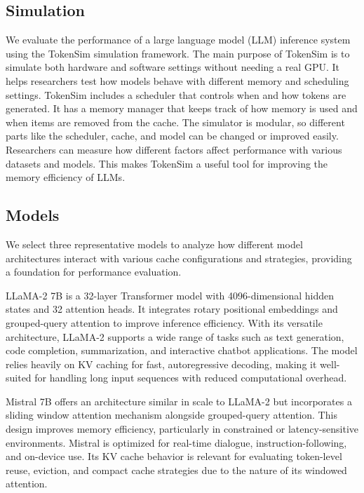 \documentclass[sigconf,nonacm]{acmart}
\begin{document}
\vspace{-1em}
\subsection{Simulation}
\label{sec:subsection}
 We evaluate the performance of a large language model (LLM) inference system using the TokenSim simulation framework. The main purpose of TokenSim is to simulate both hardware and software settings without needing a real GPU. It helps researchers test how models behave with different memory and scheduling settings. TokenSim includes a scheduler that controls when and how tokens are generated. It has a memory manager that keeps track of how memory is used and when items are removed from the cache. The simulator is modular, so different parts like the scheduler, cache, and model can be changed or improved easily. Researchers can measure how different factors affect performance with various datasets and models. This makes TokenSim a useful tool for improving the memory efficiency of LLMs.
\subsection{Models}
\label{sec:subsection}
We select three representative models to analyze how different model architectures interact with various cache configurations and strategies, providing a foundation for performance evaluation.

LLaMA-2 7B \cite{touvron2023llama2}is a 32-layer Transformer model with 4096-dimensional hidden states and 32 attention heads. It integrates rotary positional embeddings and grouped-query attention to improve inference efficiency. With its versatile architecture, LLaMA-2 supports a wide range of tasks such as text generation, code completion, summarization, and interactive chatbot applications. The model relies heavily on KV caching for fast, autoregressive decoding, making it well-suited for handling long input sequences with reduced computational overhead.  

Mistral 7B \cite{mistral2023} offers an architecture similar in scale to LLaMA-2 but incorporates a sliding window attention mechanism alongside grouped-query attention. This design improves memory efficiency, particularly in constrained or latency-sensitive environments. Mistral is optimized for real-time dialogue, instruction-following, and on-device use. Its KV cache behavior is relevant for evaluating token-level reuse, eviction, and compact cache strategies due to the nature of its windowed attention. 
\end{document}
